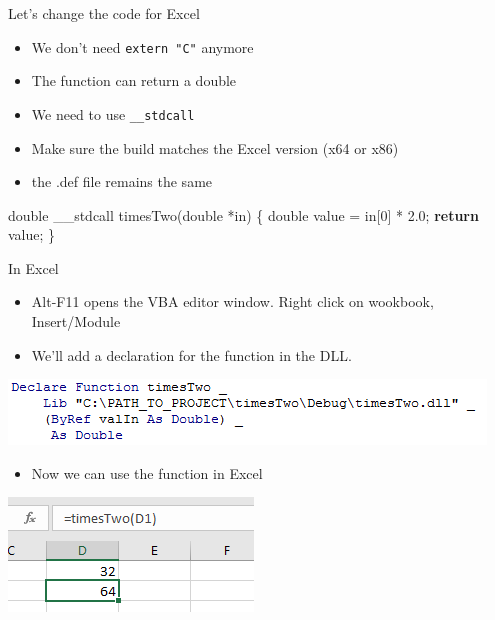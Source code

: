 \documentclass[ignorenonframetext,]{beamer}
\newenvironment{Shaded}{\begin{snugshade}}{\end{snugshade}}
\newcommand{\KeywordTok}[1]{\textcolor[rgb]{0.13,0.29,0.53}{\textbf{{#1}}}}
\newcommand{\DataTypeTok}[1]{\textcolor[rgb]{0.13,0.29,0.53}{{#1}}}
\newcommand{\DecValTok}[1]{\textcolor[rgb]{0.00,0.00,0.81}{{#1}}}
\newcommand{\FloatTok}[1]{\textcolor[rgb]{0.00,0.00,0.81}{{#1}}}
\newcommand{\NormalTok}[1]{{#1}}
\providecommand{\tightlist}{%
\setlength{\itemsep}{0pt}\setlength{\parskip}{0pt}}
\begin{document}
\begin{frame}[fragile]{Let's change the code for Excel}

\begin{itemize}
\tightlist
\item
  We don't need \texttt{extern\ "C"} anymore
\item
  The function can return a double
\item
  We need to use \texttt{\_\_stdcall}
\item
  Make sure the build matches the Excel version (x64 or x86)
\item
  the .def file remains the same
\end{itemize}

\begin{Shaded}
\begin{Highlighting}[]
\DataTypeTok{double} \NormalTok{__stdcall timesTwo(}\DataTypeTok{double} \NormalTok{*in)}
\NormalTok{\{}
    \DataTypeTok{double} \NormalTok{value = in[}\DecValTok{0}\NormalTok{] * }\FloatTok{2.0}\NormalTok{;}
    \KeywordTok{return} \NormalTok{value;}
\NormalTok{\}}
\end{Highlighting}
\end{Shaded}

\end{frame}

\begin{frame}{In Excel}

\begin{itemize}
\tightlist
\item
  Alt-F11 opens the VBA editor window. Right click on wookbook,
  Insert/Module
\item
  We'll add a declaration for the function in the DLL.
\end{itemize}

\centerline{
  \includegraphics[width=\textwidth,height=0.8\textheight,keepaspectratio]{./vba.png}
}

\begin{itemize}
\tightlist
\item
  Now we can use the function in Excel
\end{itemize}

\centerline{
  \includegraphics[width=\textwidth,height=0.2\textheight,keepaspectratio]{./inXL.png}
}

\end{frame}
\end{document}
